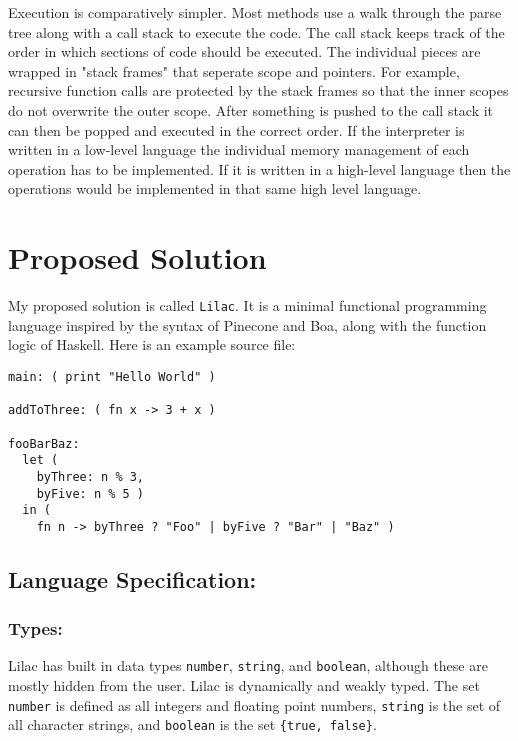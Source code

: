 \documentclass[a4paper, 11pt]{report}
\begin{document}
Execution is comparatively simpler. Most methods use a walk through the parse tree along with a call stack to execute the code. The call stack keeps track of the order in which sections of code should be executed. The individual pieces are wrapped in "stack frames" that seperate scope and pointers. For example, recursive function calls are protected by the stack frames so that the inner scopes do not overwrite the outer scope. After something is pushed to the call stack it can then be popped and executed in the correct order. If the interpreter is written in a low-level language the individual memory management of each operation has to be implemented. If it is written in a high-level language then the operations would be implemented in that same high level language.\\

\section{Proposed Solution}\label{sec:proposed-solution}

My proposed solution is called \verb|Lilac|. It is a minimal functional programming language inspired by the syntax of Pinecone and Boa, along with the function logic of Haskell. Here is an example source file:\\
\begin{verbatim}
main: ( print "Hello World" )

addToThree: ( fn x -> 3 + x )

fooBarBaz:
  let (
    byThree: n % 3,
    byFive: n % 5 )
  in (
    fn n -> byThree ? "Foo" | byFive ? "Bar" | "Baz" )
\end{verbatim}
\subsection{Language Specification:}\label{sec:language-specification}
\subsubsection{Types:}
Lilac has built in data types \verb|number|, \verb|string|, and \verb|boolean|, although these are mostly hidden from the user. Lilac is dynamically and weakly typed. The set \verb|number| is defined as all integers and floating point numbers, \verb|string| is the set of all character strings, and \verb|boolean| is the set \verb|{true, false}|.\\
\end{document}
